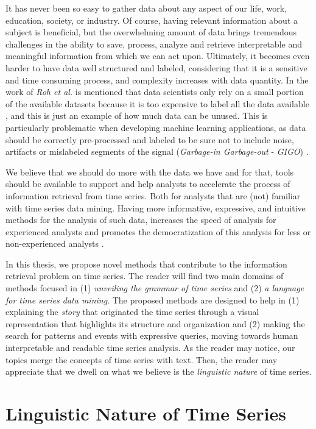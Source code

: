 It has never been so easy to gather data about any aspect of our life, work, education, society, or industry. Of course, having relevant information about a subject is beneficial, but the overwhelming amount of data brings tremendous challenges in the ability to save, process, analyze and retrieve interpretable and meaningful information from which we can act upon\cite{bigdata}. Ultimately, it becomes even harder to have data well structured and labeled, considering that it is a sensitive and time consuming process, and complexity increases with data quantity. In the work of \textit{Roh et al.} is mentioned that data scientists only rely on a small portion of the available datasets because it is too expensive to label all the data available \cite{roh2019survey}, and this is just an example of how much data can be unused. This is particularly problematic when developing machine learning applications, as data should be correctly pre-processed and labeled to be sure not to include noise, artifacts or mislabeled segments of the signal (\textit{Garbage-in Garbage-out} - \textit{GIGO}) \cite{roh2019survey}.
\par
We believe that we should do more with the data we have and for that, tools should be available to support and help analysts to accelerate the process of information retrieval from time series. Both for analysts that are (not) familiar with time series data mining. Having more informative, expressive, and intuitive methods for the analysis of such data, increases the speed of analysis for experienced analysts and promotes the democratization of this analysis for less or non-experienced analysts \cite{democratize}.
\par
In this thesis, we propose novel methods that contribute to the information retrieval problem on time series. The reader will find two main domains of methods focused in (1) \textit{unveiling the grammar of time series} and (2) \textit{a language for time series data mining}. The proposed methods are designed to help in (1) explaining the \textit{story} that originated the time series through a visual representation that highlights its structure and organization and (2) making the search for patterns and events with expressive queries, moving towards human interpretable and readable time series analysis. As the reader may notice, our topics merge the concepts of time series with text. Then, the reader may appreciate that we dwell on what we believe is the \textit{linguistic nature} of time series.  

\section{Linguistic Nature of Time Series}
\label{sub:context1}

